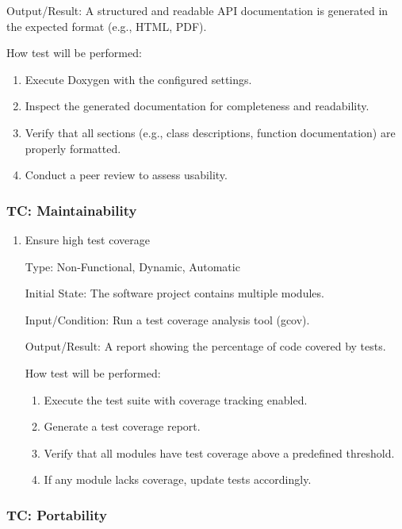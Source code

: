 \documentclass[12pt, titlepage]{article}
\begin{document}
\begin{enumerate}
  Output/Result: A structured and readable API documentation is generated in the
  expected format (e.g., HTML, PDF).

  How test will be performed:
  \begin{enumerate}
    \item Execute Doxygen with the configured settings.
    \item Inspect the generated documentation for completeness and readability.
    \item Verify that all sections (e.g., class descriptions, function
    documentation) are properly formatted.
    \item Conduct a peer review to assess usability.
  \end{enumerate}
\end{enumerate}

 \label{TC_MAINTAINABILITY}
\subsubsection{TC\thetestcasenum : Maintainability}

\begin{enumerate}

  \item{Ensure high test coverage \\}

  Type: Non-Functional, Dynamic, Automatic

  Initial State: The software project contains multiple modules.

  Input/Condition: Run a test coverage analysis tool (gcov).

  Output/Result: A report showing the percentage of code covered by tests.

  How test will be performed:
  \begin{enumerate}
    \item Execute the test suite with coverage tracking enabled.
    \item Generate a test coverage report.
    \item Verify that all modules have test coverage above a predefined
    threshold.
    \item If any module lacks coverage, update tests accordingly.
  \end{enumerate}
\end{enumerate}

 \label{TC_PORTABILITY}
\subsubsection{TC\thetestcasenum : Portability}
\end{document}

